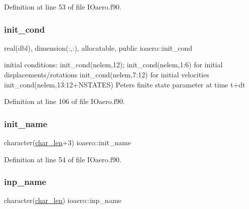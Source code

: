 Definition at line 53 of file I\+Oaero.\+f90.

\mbox{\label{namespaceioaero_ad88d83709eb2f4596a89098db11ba770}} 
\subsubsection{\texorpdfstring{init\+\_\+cond}{init\_cond}}
{\footnotesize\ttfamily real(dbl), dimension(\+:,\+:), allocatable, public ioaero\+::init\+\_\+cond}



initial conditions\+: init\+\_\+cond(nelem,12); init\+\_\+cond(nelem,1\+:6) for initial displacements/rotations init\+\_\+cond(nelem,7\+:12) for initial velocities init\+\_\+cond(nelem,13\+:12+\+N\+S\+T\+A\+T\+ES) Peters finite state parameter at time t+dt 



Definition at line 106 of file I\+Oaero.\+f90.

\mbox{\label{namespaceioaero_a5a12b8b21f86b26e7364428778a85d0b}} 
\subsubsection{\texorpdfstring{init\+\_\+name}{init\_name}}
{\footnotesize\ttfamily character(\hyperlink{namespaceioaero_acd6bdfdcfd986fd1c26261e5996e3b03}{char\+\_\+len}+3) ioaero\+::init\+\_\+name\hspace{0.3cm}{\ttfamily [private]}}



Definition at line 54 of file I\+Oaero.\+f90.

\mbox{\label{namespaceioaero_ae3b39e5c092106ddc3bb8b81daf8bd13}} 
\subsubsection{\texorpdfstring{inp\+\_\+name}{inp\_name}}
{\footnotesize\ttfamily character(\hyperlink{namespaceioaero_acd6bdfdcfd986fd1c26261e5996e3b03}{char\+\_\+len}) ioaero\+::inp\+\_\+name\hspace{0.3cm}{\ttfamily [private]}}



